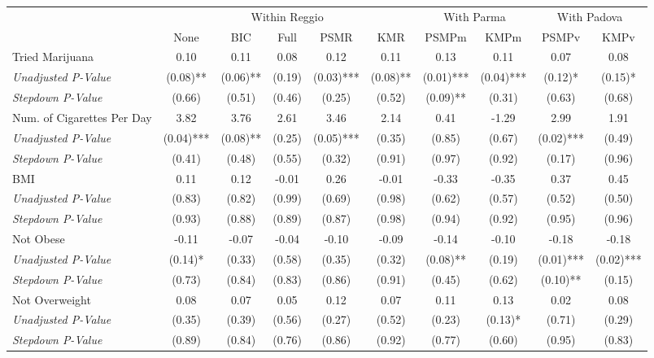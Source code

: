 \begin{tabular}{l c c c c c c c c c}
\toprule
& \multicolumn{5}{c}{Within Reggio} & \multicolumn{2}{c}{With Parma} & \multicolumn{2}{c}{With Padova} \\\cmidrule(lr){2-6} \cmidrule(lr){7-8} \cmidrule(lr){9-10}
 & None & BIC & Full & PSMR & KMR & PSMPm & KMPm & PSMPv & KMPv \\
\midrule
Tried Marijuana & 0.10 & 0.11 & 0.08 & 0.12 & 0.11 & 0.13 & 0.11 & 0.07 & 0.08 \\
\quad \textit{Unadjusted P-Value} & (0.08)** & (0.06)** & (0.19) & (0.03)*** & (0.08)** & (0.01)*** & (0.04)*** & (0.12)* & (0.15)* \\
\quad \textit{Stepdown P-Value} & (0.66) & (0.51) & (0.46) & (0.25) & (0.52) & (0.09)** & (0.31) & (0.63) & (0.68) \\
Num. of Cigarettes Per Day & 3.82 & 3.76 & 2.61 & 3.46 & 2.14 & 0.41 & -1.29 & 2.99 & 1.91 \\
\quad \textit{Unadjusted P-Value} & (0.04)*** & (0.08)** & (0.25) & (0.05)*** & (0.35) & (0.85) & (0.67) & (0.02)*** & (0.49) \\
\quad \textit{Stepdown P-Value} & (0.41) & (0.48) & (0.55) & (0.32) & (0.91) & (0.97) & (0.92) & (0.17) & (0.96) \\
BMI & 0.11 & 0.12 & -0.01 & 0.26 & -0.01 & -0.33 & -0.35 & 0.37 & 0.45 \\
\quad \textit{Unadjusted P-Value} & (0.83) & (0.82) & (0.99) & (0.69) & (0.98) & (0.62) & (0.57) & (0.52) & (0.50) \\
\quad \textit{Stepdown P-Value} & (0.93) & (0.88) & (0.89) & (0.87) & (0.98) & (0.94) & (0.92) & (0.95) & (0.96) \\
Not Obese & -0.11 & -0.07 & -0.04 & -0.10 & -0.09 & -0.14 & -0.10 & -0.18 & -0.18 \\
\quad \textit{Unadjusted P-Value} & (0.14)* & (0.33) & (0.58) & (0.35) & (0.32) & (0.08)** & (0.19) & (0.01)*** & (0.02)*** \\
\quad \textit{Stepdown P-Value} & (0.73) & (0.84) & (0.83) & (0.86) & (0.91) & (0.45) & (0.62) & (0.10)** & (0.15) \\
Not Overweight & 0.08 & 0.07 & 0.05 & 0.12 & 0.07 & 0.11 & 0.13 & 0.02 & 0.08 \\
\quad \textit{Unadjusted P-Value} & (0.35) & (0.39) & (0.56) & (0.27) & (0.52) & (0.23) & (0.13)* & (0.71) & (0.29) \\
\quad \textit{Stepdown P-Value} & (0.89) & (0.84) & (0.76) & (0.86) & (0.92) & (0.77) & (0.60) & (0.95) & (0.83) \\

\end{tabular}
